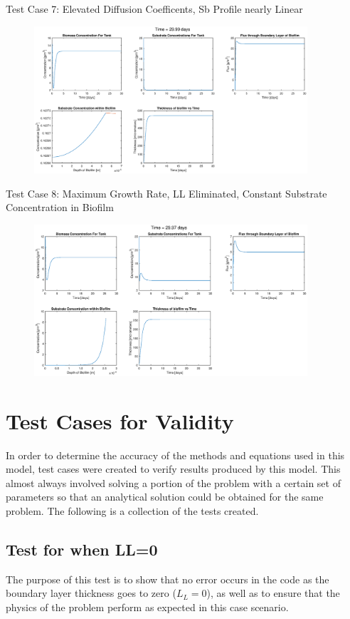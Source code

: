\documentclass[letterpaper, twoside]{article}
\numberwithin{equation}{section}
\begin{document}
Test Case 7: Elevated Diffusion Coefficents, Sb Profile nearly Linear
\begin{figure}[H]
  \centering
  \includegraphics[read=eps, width=4in]{Testcase7_figure.eps}
\end{figure}

Test Case 8: Maximum Growth Rate, LL Eliminated, Constant Substrate Concentration in Biofilm
\begin{figure}[H]
  \centering
  \includegraphics[read=eps, width=4in]{Testcase8_figure.eps}
\end{figure}

\section{Test Cases for Validity}
In order to determine the accuracy of the methods and equations used in this model, test cases were created to verify results produced by this model. This almost always involved solving a portion of the problem with a certain set of parameters so that an analytical solution could be obtained for the same problem. The following is a collection of the tests created.

\subsection{Test for when LL=0}
The purpose of this test is to show that no error occurs in the code as the boundary layer thickness goes to zero ($L_L=0$), as well as to ensure that the physics of the problem perform as expected in this case scenario.
\end{document}
